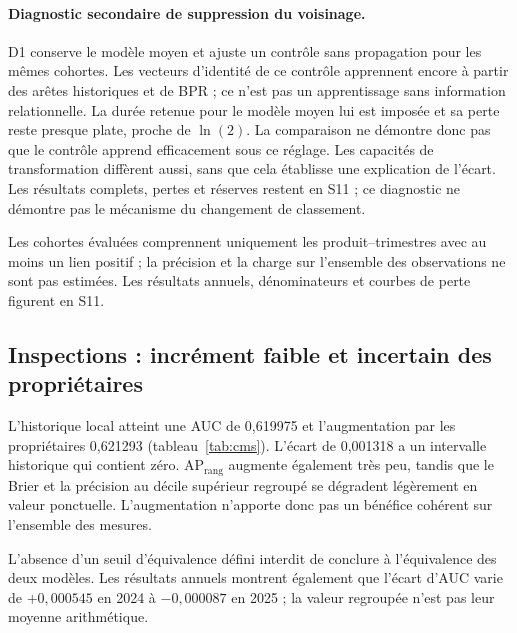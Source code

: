 \paragraph{Diagnostic secondaire de suppression du voisinage.} D1 conserve le modèle moyen et ajuste un contrôle sans propagation pour les mêmes cohortes. Les vecteurs d'identité de ce contrôle apprennent encore à partir des arêtes historiques et de BPR ; ce n'est pas un apprentissage sans information relationnelle. La durée retenue pour le modèle moyen lui est imposée et sa perte reste presque plate, proche de $\ln(2)$. La comparaison ne démontre donc pas que le contrôle apprend efficacement sous ce réglage. Les capacités de transformation diffèrent aussi, sans que cela établisse une explication de l'écart. Les résultats complets, pertes et réserves restent en S11 ; ce diagnostic ne démontre pas le mécanisme du changement de classement.

Les cohortes évaluées comprennent uniquement les produit--trimestres avec au moins un lien positif ; la précision et la charge sur l'ensemble des observations ne sont pas estimées. Les résultats annuels, dénominateurs et courbes de perte figurent en S11.

\subsection{Inspections : incrément faible et incertain des propriétaires}

\begin{table}[!htbp]
\centering\small
\caption{Inspections CMS, prédictions de test 2024--2025 regroupées. $P_{10\%}$ et $R_{10\%}$ : précision et rappel au décile calculé sur les scores regroupés, non séparément par année. Le Brier doit diminuer ; les autres mesures doivent augmenter. Source : tableau unifié\cite{hgbresults}.}
\label{tab:cms}

\end{table}

L'historique local atteint une AUC de 0,619975 et l'augmentation par les propriétaires 0,621293 (tableau~\ref{tab:cms}). L'écart de 0,001318 a un intervalle historique qui contient zéro. $\mathrm{AP}_{\mathrm{rang}}$ augmente également très peu, tandis que le Brier et la précision au décile supérieur regroupé se dégradent légèrement en valeur ponctuelle. L'augmentation n'apporte donc pas un bénéfice cohérent sur l'ensemble des mesures\cite{hgbresults}.

L'absence d'un seuil d'équivalence défini interdit de conclure à l'équivalence des deux modèles. Les résultats annuels montrent également que l'écart d'AUC varie de $+0,000545$ en 2024 à $-0,000087$ en 2025 ; la valeur regroupée n'est pas leur moyenne arithmétique\cite{hgbresults}.


